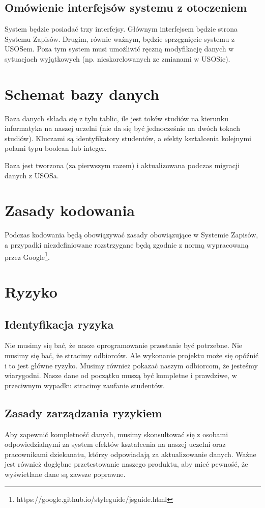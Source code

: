 \documentclass{article}
\begin{document}
\subsection{Omówienie interfejsów systemu z otoczeniem}
System będzie posiadać trzy interfejsy.
Głównym interfejsem będzie strona Systemu Zapisów.
Drugim, równie ważnym, będzie sprzęgnięcie systemu z USOSem.
Poza tym system musi umożliwić ręczną modyfikację danych w sytuacjach wyjątkowych (np. nieskorelowanych ze zmianami w USOSie).


\section{Schemat bazy danych}
Baza danych składa się z tylu tablic, ile jest toków studiów na kierunku informatyka na naszej uczelni (nie da się być jednocześnie na dwóch tokach studiów).
Kluczami są identyfikatory studentów, a efekty kształcenia kolejnymi polami typu boolean lub integer.

Baza jest tworzona (za pierwszym razem) i aktualizowana podczas migracji danych z USOSa.


\section{Zasady kodowania}
Podczas kodowania będą obowiązywać zasady obowiązujące w Systemie Zapisów, a przypadki niezdefiniowane rozstrzygane będą zgodnie z normą wypracowaną przez Google\footnote{https://google.github.io/styleguide/jsguide.html}.


\newpage


\section{Ryzyko}

\subsection{Identyfikacja ryzyka}
Nie musimy się bać, że nasze oprogramowanie przestanie być potrzebne. Nie musimy się bać, że stracimy odbiorców. Ale wykonanie projektu może się opóźnić i to jest główne ryzyko.
Musimy również pokazać naszym odbiorcom, że jesteśmy wiarygodni. Nasze dane od początku muszą być kompletne i prawdziwe, w przeciwnym wypadku stracimy zaufanie studentów.

\subsection{Zasady zarządzania ryzykiem}
Aby zapewnić kompletność danych, musimy skonsultować się z osobami odpowiedzialnymi za system efektów kształcenia na naszej uczelni oraz pracownikami dziekanatu, którzy odpowiadają za aktualizowanie danych.
Ważne jest również dogłębne przetestowanie naszego produktu, aby mieć pewność, że wyświetlane dane są zawsze poprawne.
\end{document}
